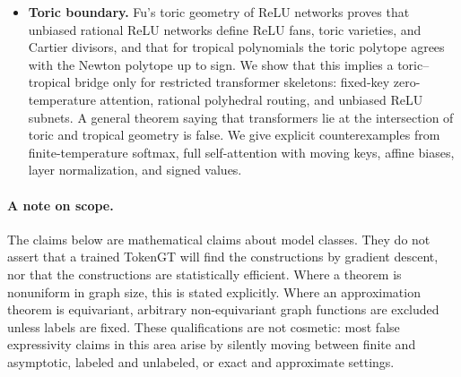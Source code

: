 \documentclass[11pt]{article}
\begin{document}
\begin{itemize}
  \item \textbf{Toric boundary.}  Fu's toric geometry of ReLU networks \cite{fu2025toricrelu} proves that unbiased rational ReLU networks define ReLU fans, toric varieties, and Cartier divisors, and that for tropical polynomials the toric polytope agrees with the Newton polytope up to sign.  We show that this implies a toric--tropical bridge only for restricted transformer skeletons: fixed-key zero-temperature attention, rational polyhedral routing, and unbiased ReLU subnets.  A general theorem saying that transformers lie at the intersection of toric and tropical geometry is false.  We give explicit counterexamples from finite-temperature softmax, full self-attention with moving keys, affine biases, layer normalization, and signed values.
\end{itemize}

\paragraph{A note on scope.}
The claims below are mathematical claims about model classes.  They do not assert that a trained TokenGT will find the constructions by gradient descent, nor that the constructions are statistically efficient.  Where a theorem is nonuniform in graph size, this is stated explicitly.  Where an approximation theorem is equivariant, arbitrary non-equivariant graph functions are excluded unless labels are fixed.  These qualifications are not cosmetic: most false expressivity claims in this area arise by silently moving between finite and asymptotic, labeled and unlabeled, or exact and approximate settings.
\end{document}

